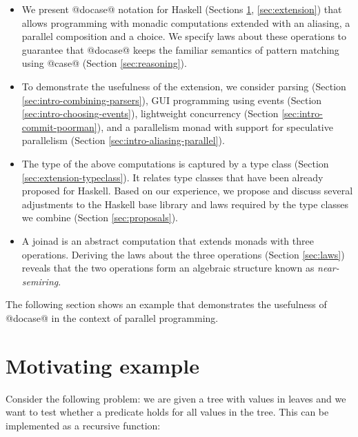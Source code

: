 \documentclass[preprint]{sigplanconf}
\begin{document}
\begin{itemize}
\item We present @docase@ notation for Haskell (Sections \ref{sec:motivation}, \ref{sec:extension}) 
  that allows programming with monadic computations extended with an aliasing, a parallel composition
  and a choice. We specify laws about these operations to guarantee that @docase@ keeps the familiar 
  semantics of pattern matching using @case@ (Section \ref{sec:reasoning}).

\item To demonstrate the usefulness of the extension, we consider parsing
  (Section \ref{sec:intro-combining-parsers}), GUI programming using events
  (Section \ref{sec:intro-choosing-events}), lightweight concurrency
  (Section \ref{sec:intro-commit-poorman}), and a parallelism monad with
  support for speculative parallelism (Section \ref{sec:intro-aliasing-parallel}).

\item The type of the above computations is captured by a  type class (Section 
  \ref{sec:extension-typeclass}). It relates type classes that have been already proposed for 
  Haskell. Based on our experience, we propose and discuss several adjustments to the Haskell base 
  library and laws required by the type classes we combine (Section \ref{sec:proposals}). 

\item A joinad is an abstract computation that extends monads with three operations.
  Deriving the laws about the three operations (Section \ref{sec:laws}) reveals that the two
  operations form an algebraic structure known as \textit{near-semiring}.

\end{itemize}
The following section shows an example that demonstrates the usefulness of @docase@ in the context 
of parallel programming.


\section{Motivating example}
\label{sec:motivation}

Consider the following problem: we are given a tree with values in leaves and we want to test
whether a predicate holds for all values in the tree. This can be implemented as a recursive function:
\end{document}
